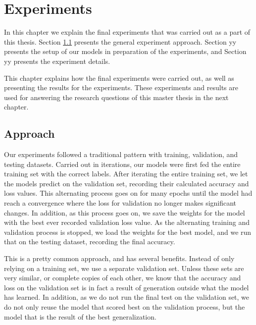 
\chapter{Experiments}
\label{ch:experiments}
In this chapter we explain the final experiments that was carried out as a part of this thesis. Section \ref{sec:approach} presents the general experiment approach. Section yy presents the setup of our models in preparation of the experiments, and Section yy presents the experiment details.

This chapter explains how the final experiments were carried out, as well as presenting the results for the experiments. These experiments and results are used for answering the research questions of this master thesis in the next chapter.


\section{Approach}
\label{sec:approach}
Our experiments followed a traditional pattern with training, validation, and testing datasets. Carried out in iterations, our models were first fed the entire training set with the correct labels. After iterating the entire training set, we let the models predict on the validation set, recording their calculated accuracy and loss values. This alternating process goes on for many epochs until the model had reach a convergence where the loss for validation no longer makes significant changes. In addition, as this process goes on, we save the weights for the model with the best ever recorded validation loss value. As the alternating training and validation process is stopped, we load the weights for the best model, and we run that on the testing dataset, recording the final accuracy.

This is a pretty common approach, and has several benefits. Instead of only relying on a training set, we use a separate validation set. Unless these sets are very similar, or complete copies of each other, we know that the accuracy and loss on the validation set is in fact a result of generation outside what the model has learned. In addition, as we do not run the final test on the validation set, we do not only reuse the model that scored best on the validation process, but the model that is the result of the best generalization.


